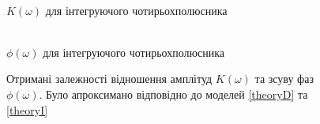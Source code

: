 \begin{figure}[h]
\begin{minipage}[h]{0.47\linewidth}
		 \\$K(\omega)$ для інтегруючого чотирьохполюсника
	\end{minipage}
	\hfill
	\begin{minipage}[h]{0.47\linewidth}
		 \\$\phi(\omega)$ для інтегруючого чотирьохполюсника
	\end{minipage}
	\caption{Отримані залежності відношення амплітуд $K(\omega)$ та зсуву фаз $\phi(\omega)$. Було апроксимано відповідно до моделей \ref{theoryD} та \ref{theoryI}}
	\label{fig:expkph}
\end{figure}


